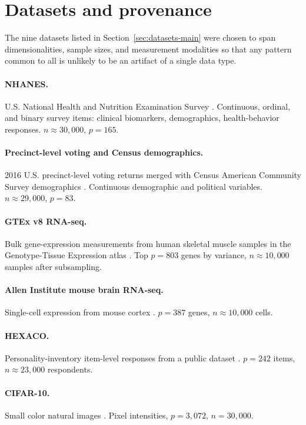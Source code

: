 \section{Datasets and provenance}
\label{si:datasets}

The nine datasets listed in Section~\ref{sec:datasets-main} were chosen to span dimensionalities, sample sizes, and measurement modalities so that any pattern common to all is unlikely to be an artifact of a single data type.

\paragraph{NHANES.} U.S. National Health and Nutrition Examination Survey \citep{nhanes}. Continuous, ordinal, and binary survey items: clinical biomarkers, demographics, health-behavior responses. $n\approx 30{,}000$, $p=165$.

\paragraph{Precinct-level voting and Census demographics.} 2016 U.S. precinct-level voting returns merged with Census American Community Survey demographics \citep{hill2019}. Continuous demographic and political variables. $n\approx 29{,}000$, $p=83$.

\paragraph{GTEx v8 RNA-seq.} Bulk gene-expression measurements from human skeletal muscle samples in the Genotype-Tissue Expression atlas \citep{gtex2020}. Top $p=803$ genes by variance, $n\approx 10{,}000$ samples after subsampling.

\paragraph{Allen Institute mouse brain RNA-seq.} Single-cell expression from mouse cortex \citep{tasic2018}. $p=387$ genes, $n\approx 10{,}000$ cells.

\paragraph{HEXACO.} Personality-inventory item-level responses from a public dataset \citep{ashton2004}. $p=242$ items, $n\approx 23{,}000$ respondents.

\paragraph{CIFAR-10.} Small color natural images \citep{krizhevsky2009}. Pixel intensities, $p=3{,}072$, $n=30{,}000$.

